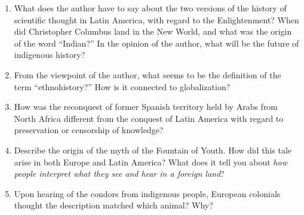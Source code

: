 \documentclass[10pt]{article}
\begin{document}
\begin{enumerate}
\item What does the author have to say about the two versions of the history of scientific thought in Latin America, with regard to the Enlightenment? When did Christopher Columbus land in the New World, and what was the origin of the word ``Indian?'' In the opinion of the author, what will be the future of indigenous history? \\ \vspace{2cm}
\item From the viewpoint of the author, what seems to be the definition of the term ``ethnohistory?''  How is it connected to globalization? \\ \vspace{2cm}
\item How was the reconquest of former Spanish territory held by Arabs from North Africa different from the conquest of Latin America with regard to preservation or censorship of knowledge? \\ \vspace{1cm}
\item Describe the origin of the myth of the Fountain of Youth.  How did this tale arise in both Europe and Latin America? What does it tell you about \textit{how people interpret what they see and hear in a foreign land}? \\ \vspace{1cm}
\item Upon hearing of the condors from indigenous people, European colonials thought the description matched which animal?  Why?
\end{enumerate}
\end{document}
